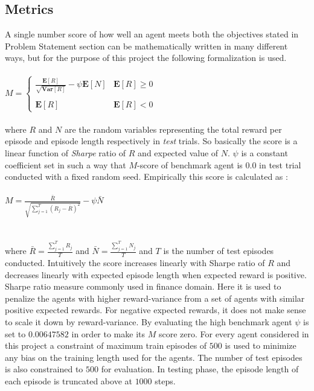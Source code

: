 \documentclass{article}
\begin{document}
\subsection*{Metrics}
A single number score of how well an agent meets both the objectives stated in Problem Statement section can be mathematically written in many different ways, but for the purpose of this project the following formalization is used.\\\\
$M = \begin{cases} \frac{\mathbf{E}[R]}{\sqrt{\mathbf{Var}[R]}} - \psi \mathbf{E}[N] & \mathbf{E}[R] \ge 0\\\\
 \mathbf{E}[R] & \mathbf{E}[R] < 0 \end{cases}$\\\\
where $R$ and $N$ are the random variables representing the total reward per episode and episode length respectively in \textit{test} trials. So basically the score is a linear function of \textit{Sharpe} ratio of $R$ and expected value of $N$. $\psi$ is a constant coefficient set in such a way that $M$-score of benchmark agent is 0.0 in test trial conducted with a fixed random seed. Empirically this score is calculated as :\\\\
$M = \frac{\bar{R}}{\sqrt{\sum_{j=1}^{T} \left( R_j - \bar{R}\right)^2}} - \psi \bar{N}$\\\\\\
where $\bar{R} = \frac{\sum_{j=1}^{T} R_j}{T}$ and $\bar{N} = \frac{\sum_{j=1}^{T} N_j}{T}$ and $T$ is the number of test episodes conducted. Intuitively the score increases linearly with Sharpe ratio of $R$ and decreases linearly with expected episode length when expected reward is positive. Sharpe ratio measure commonly used in finance domain. Here it is used to penalize the agents with higher reward-variance from a set of agents with similar positive expected rewards. For negative expected rewards, it does not make sense to scale it down by reward-variance.
By evaluating the high benchmark agent $\psi$ is set to $0.00647582$ in order to make its $M$ score zero. For every agent considered in this project a constraint of maximum train episodes of $500$ is used to minimize any bias on the training length used for the agents. The number of test episodes is also constrained to $500$ for evaluation. In testing phase, the episode length of each episode is truncated above at $1000$ steps.
\end{document}

